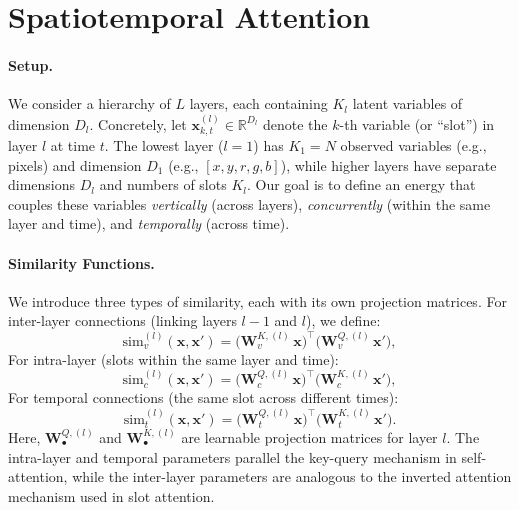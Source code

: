 \documentclass{article}
\begin{document}
\section{Spatiotemporal Attention}

\paragraph{Setup.}
We consider a hierarchy of \(L\) layers, each containing \(K_l\) latent variables of dimension \(D_l\). Concretely, let 
\(\bm{x}_{k,t}^{(l)} \in \mathbb{R}^{D_l}\)
denote the \(k\)-th variable (or ``slot'') in layer \(l\) at time \(t\). The lowest layer (\(l=1\)) has \(K_1 = N\) observed variables (e.g., pixels) and dimension \(D_1\) (e.g., \([x, y, r, g, b]\)), while higher layers have separate dimensions \(D_l\) and numbers of slots \(K_l\). Our goal is to define an energy that couples these variables \emph{vertically} (across layers), \emph{concurrently} (within the same layer and time), and \emph{temporally} (across time).

\paragraph{Similarity Functions.}
We introduce three types of similarity, each with its own projection matrices. For inter-layer connections (linking layers \(l-1\) and \(l\)), we define:
\begin{equation}
\mathrm{sim}_{v}^{(l)}(\bm{x}, \bm{x}')
=
\bigl(\bm{W}_{v}^{K,(l)}\,\bm{x}\bigr)^\top
\bigl(\bm{W}_{v}^{Q,(l)}\,\bm{x}'\bigr),
\end{equation}
For intra-layer (slots within the same layer and time):
\begin{equation}
\mathrm{sim}_{c}^{(l)}(\bm{x}, \bm{x}')
=
\bigl(\bm{W}_{c}^{Q,(l)}\,\bm{x}\bigr)^\top
\bigl(\bm{W}_{c}^{K,(l)}\,\bm{x}'\bigr),
\end{equation}
For temporal connections (the same slot across different times):
\begin{equation}
\mathrm{sim}_{t}^{(l)}(\bm{x}, \bm{x}')
=
\bigl(\bm{W}_{t}^{Q,(l)}\,\bm{x}\bigr)^\top
\bigl(\bm{W}_{t}^{K,(l)}\,\bm{x}'\bigr).
\end{equation}
Here, \(\bm{W}_{\bullet}^{Q,(l)}\) and \(\bm{W}_{\bullet}^{K,(l)}\) are learnable projection matrices for layer \(l\). The intra-layer and temporal parameters parallel the key-query mechanism in self-attention, while the inter-layer parameters are analogous to the inverted attention mechanism used in slot attention.
\end{document}
